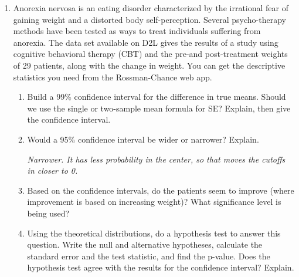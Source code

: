 \begin{enumerate}
       \item 
         Anorexia nervosa is an eating disorder characterized by
         the irrational fear of gaining weight and a distorted body
         self-perception.  Several 
         psycho-therapy methods have been tested as  ways to treat
         individuals suffering from anorexia.  The data set available
         on D2L gives the results of a study using cognitive
         behavioral therapy (CBT) and the pre-and post-treatment
         weights of 29 patients, along with the change in weight. 
         You can get the descriptive statistics you
           need from the Rossman-Chance web app.   
         \begin{enumerate}
         \item\label{int1}  Build a 99\% confidence interval for the
           difference in true means.   
            Should we use the single or two-sample mean
           formula for SE?  Explain, then give the confidence
           interval. 
\begin{students}
          \vspace{2cm}
\end{students}
\begin{key}
 {\it  }      
\end{key}


         \item Would a 95\% confidence interval be wider or narrower?
           Explain. 
\begin{students}
          \vspace{2cm}
\end{students}
\begin{key}
 {\it Narrower. It has less probability in the center, so that moves
   the cutoffs in closer to 0. }      
\end{key}

         \item  Based on the confidence intervals, do the patients
           seem to improve (where improvement is based on increasing
           weight)?  What significance level is being used?
\begin{students}
          \vspace{2cm}
\end{students}
\begin{key}
 {\it  }      
\end{key}
           

         \item  Using the theoretical distributions, do a hypothesis
           test to answer this question.  Write the null and
           alternative hypotheses, calculate the standard error and
           the test statistic, and find the p-value.  Does the
           hypothesis test agree with the results for the confidence
           interval?  Explain. 
\begin{students}
          \vspace{4cm}\newpage
\end{students}
\begin{key}
 {\it  }      
\end{key}


\end{enumerate}
\end{enumerate}
